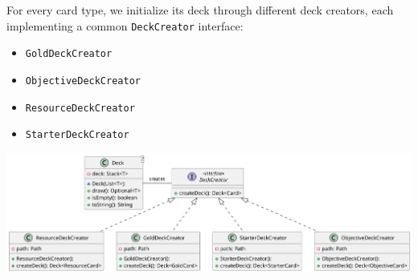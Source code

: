 \documentclass{article}
\begin{document}
\noindent For every card type, we initialize its deck through different deck creators, each implementing a common \texttt{DeckCreator} interface:
\begin{itemize}
    \item \texttt{GoldDeckCreator}
    \item \texttt{ObjectiveDeckCreator}
    \item \texttt{ResourceDeckCreator}
    \item \texttt{StarterDeckCreator}
\end{itemize}

\vspace{1cm}
\begin{center}
    \hspace*{-1cm}\includegraphics[scale=0.15]{pngs/deck}
\end{center}

\newpage
\end{document}
